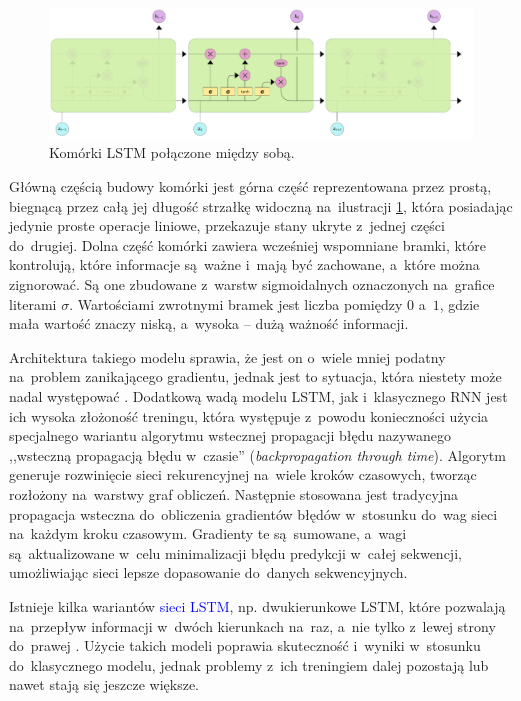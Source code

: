 \documentclass[data-science]{agh-wi} %
\begin{document}
\begin{figure}[ht!]
    \begin{center}
        \includegraphics[width=0.8\linewidth]{./img/new_lstm_chain.pdf}
    \end{center}
    \caption{Komórki LSTM połączone między sobą.}\label{fig:lstm_chain}
\end{figure}

Główną częścią budowy komórki jest górna część reprezentowana przez prostą, biegnącą przez całą jej długość strzałkę widoczną na~ilustracji \ref*{fig:lstm_chain}, która posiadając jedynie proste operacje liniowe, przekazuje stany ukryte z~jednej części do~drugiej. Dolna część komórki zawiera wcześniej wspomniane bramki, które kontrolują, które informacje są~ważne i~mają być zachowane, a~które można zignorować. Są one zbudowane z~warstw sigmoidalnych oznaczonych na~grafice literami $\sigma$. Wartościami zwrotnymi bramek jest liczba pomiędzy $0$ a~$1$, gdzie mała wartość znaczy niską, a~wysoka -- dużą ważność informacji.

Architektura takiego modelu sprawia, że jest on o~wiele mniej podatny na~problem zanikającego gradientu, jednak jest to sytuacja, która niestety może nadal występować \cite{vanishing_gradient}. Dodatkową wadą modelu LSTM, jak i~klasycznego RNN jest ich wysoka złożoność treningu, która występuje z~powodu konieczności użycia specjalnego wariantu algorytmu wstecznej propagacji błędu nazywanego ,,wsteczną propagacją błędu w~czasie'' (\textit{backpropagation through time}). Algorytm generuje rozwinięcie sieci rekurencyjnej na~wiele kroków czasowych, tworząc rozłożony na~warstwy graf obliczeń. Następnie stosowana jest tradycyjna propagacja wsteczna do~obliczenia gradientów błędów w~stosunku do~wag sieci na~każdym kroku czasowym. Gradienty te są~sumowane, a~wagi są~aktualizowane w~celu minimalizacji błędu predykcji w~całej sekwencji, umożliwiając sieci lepsze dopasowanie do~danych sekwencyjnych.

Istnieje kilka wariantów \textcolor{blue}{sieci LSTM}, np. dwukierunkowe LSTM, które pozwalają na~przepływ informacji w~dwóch kierunkach na~raz, a~nie tylko z~lewej strony do~prawej \cite{bi_lstm}. Użycie takich modeli poprawia skuteczność i~wyniki w~stosunku do~klasycznego modelu, jednak problemy z~ich treningiem dalej pozostają lub nawet stają się jeszcze większe.
\end{document}
